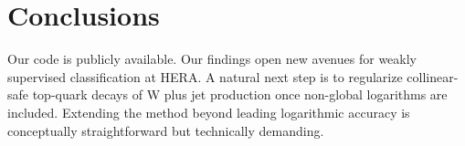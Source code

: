 \section{Conclusions}\label{sec:conclusions}

Our code is publicly available. Our findings open new avenues for weakly
supervised classification at HERA. A natural next step is to regularize
collinear-safe top-quark decays of W plus jet production once non-global
logarithms are included. Extending the method beyond leading logarithmic
accuracy is conceptually straightforward but technically demanding.

